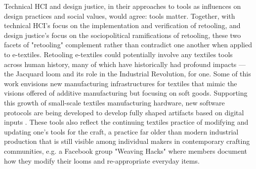 
Technical HCI and design justice, in their approaches to tools as influences on design practices and social values, would agree: tools matter. Together, with technical HCI's focus on the implementation and verification of retooling, and design justice's focus on the sociopolitical ramifications of retooling, these two facets of "retooling" complement rather than contradict one another when applied to e-textiles. Retooling e-textiles could potentially involve any textiles tools across human history, many of which have historically had profound impacts --- the Jacquard loom and its role in the Industrial Revolution, for one. Some of this work envisions new manufacturing infrastructures for textiles that mimic the visions offered of additive manufacturing but focusing on soft goods. 
Supporting this growth of small-scale textiles manufacturing hardware, new software protocols are being developed to develop fully shaped artifacts based on digital inputs \todo{[5,92]}. These tools also reflect the continuing textiles practice of modifying and updating one's tools for the craft, a practice far older than modern industrial production that is still visible among individual makers in contemporary crafting communities, e.g. a Facebook group "Weaving Hacks" \todo{[46]} where members document how they modify their looms and re-appropriate everyday items.

